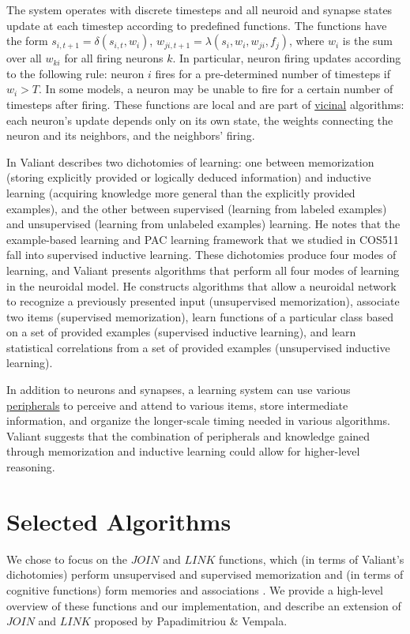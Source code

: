 \documentclass[letterpaper, 12pt]{article}
\begin{document}
The system operates with discrete timesteps and all neuroid and synapse states update at each timestep according to predefined functions. The functions have the form $s_{i,t+1}=\delta(s_{i,t},w_i)$, $w_{ji,t+1}=\lambda(s_i,w_i,w_{ji},f_j)$, where $w_i$ is the sum over all $w_{ki}$ for all firing neurons $k$. In particular, neuron firing updates according to the following rule: neuron $i$ fires for a pre-determined number of timesteps if $w_i>T$. In some models, a neuron may be unable to fire for a certain number of timesteps after firing. These functions are local and are part of \underline{vicinal} algorithms: each neuron's update depends only on its own state, the weights connecting the neuron and its neighbors, and the neighbors' firing. 

In \cite{valiant_circuits_1994} Valiant describes two dichotomies of learning: one between memorization (storing explicitly provided or logically deduced information) and inductive learning (acquiring knowledge more general than the explicitly provided examples), and the other between supervised (learning from labeled examples) and unsupervised (learning from unlabeled examples) learning. He notes that the example-based learning and PAC learning framework that we studied in COS511 fall into supervised inductive learning. These dichotomies produce four modes of learning, and Valiant presents algorithms that perform all four modes of learning in the neuroidal model. He constructs algorithms that allow a neuroidal network to recognize a previously presented input (unsupervised memorization), associate two items (supervised memorization), learn functions of a particular class based on a set of provided examples (supervised inductive learning), and learn statistical correlations from a set of provided examples (unsupervised inductive learning).

In addition to neurons and synapses, a learning system can use various \underline{peripherals} to perceive and attend to various items, store intermediate information, and organize the longer-scale timing needed in various algorithms. Valiant suggests that the combination of peripherals and knowledge gained through memorization and inductive learning could allow for higher-level reasoning.

\section{Selected Algorithms}\label{sec:selected_algorithms}
We chose to focus on the $JOIN$ and $LINK$ functions, which (in terms of Valiant's dichotomies) perform unsupervised and supervised memorization  and (in terms of cognitive functions) form memories and associations \cite{valiant_circuits_1994, papadimitriou_cortical_2015}. We provide a high-level overview of these functions and our implementation, and describe an extension of $JOIN$ and $LINK$ proposed by Papadimitriou \& Vempala.
\end{document}
